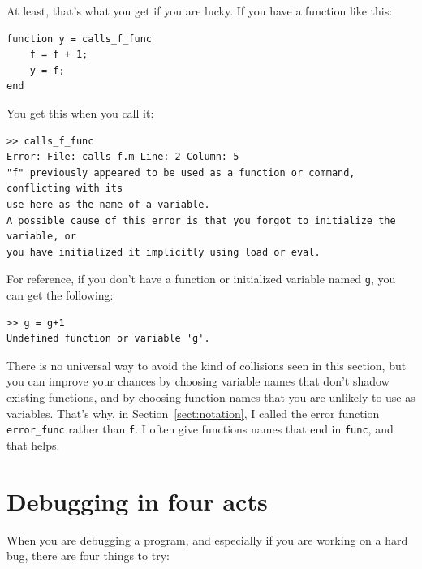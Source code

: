 \documentclass[
]{book}
\begin{document}
At least, that's what you get if you are lucky.  
If you have a function like this:

\begin{verbatim}
function y = calls_f_func
    f = f + 1;
    y = f;
end
\end{verbatim}

You get this when you call it:

\begin{verbatim}
>> calls_f_func
Error: File: calls_f.m Line: 2 Column: 5
"f" previously appeared to be used as a function or command, conflicting with its 
use here as the name of a variable.
A possible cause of this error is that you forgot to initialize the variable, or 
you have initialized it implicitly using load or eval.

\end{verbatim}

For reference, if you don't have a function or initialized variable named {\tt g}, you can 
get the following:

\begin{verbatim}
>> g = g+1
Undefined function or variable 'g'.
\end{verbatim}

There is no universal way to avoid the kind of
collisions seen in this section, but you can improve your chances by choosing
variable names that don't shadow existing functions, and by
choosing function names that you are unlikely to use as variables.
That's why, in Section~\ref{sect:notation}, I called the error function
{\tt error\_func} rather than {\tt f}.  I often give functions
names that end in {\tt func}, and that helps.


\section{Debugging in four acts}

When you are debugging a program, and especially if you are
working on a hard bug, there are four things to try:
\end{document}

